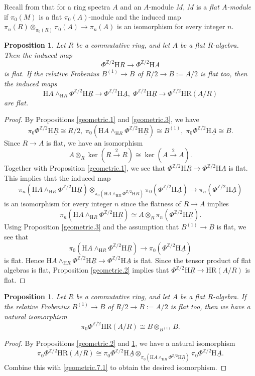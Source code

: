 \documentclass[10pt]{amsart}
\newtheorem{prop}[thm]{Proposition}
\theoremstyle{definition}
\numberwithin{equation}{section}
\newcommand{\Z}{\mathbb{Z}}
\newcommand{\rH}{\mathrm{H}}
\newcommand{\ul}{\underline}
\newcommand{\HR}{\mathrm{HR}}
\begin{document}
{Recall from \cite[Definition 7.2.2.10]{HA} that for a ring spectra $A$ and an $A$-module $M$,
$M$ is a \emph{flat $A$-module} if $\pi_0(M)$ is a flat $\pi_0(A)$-module and the induced map $\pi_n(R)\otimes_{\pi_0(R)}\pi_0(A)\to \pi_n(A)$ is an isomorphism for every integer $n$.

\begin{prop}
\label{geometric.7}
Let $R$ be a commutative ring,
and let $A$ be a flat $R$-algebra.
Then the induced map
\[
\Phi^{\Z/2}\rH \ul{R}\to \Phi^{\Z/2}\rH \ul{A}
\]
is flat.
If the relative Frobenius $B^{(1)}\to B$ of $R/2\to B:=A/2$ is flat too,
then the induced maps
\[
\rH A\wedge_{\rH R} \Phi^{\Z/2}\rH \ul{R}\to \Phi^{\Z/2}\rH \ul{A},
\;
\Phi^{\Z/2}\rH \ul{R}\to  \Phi^{\Z/2}\HR(A/R)
\]
are flat.
\end{prop}
\begin{proof}
By Propositions \ref{geometric.1} and \ref{geometric.3},
we have
\begin{equation}
\label{geometric.7.1}
\pi_0 \Phi^{\Z/2}\rH \ul{R}\cong R/2,
\;
\pi_0 (\rH A\wedge_{\rH R}\Phi^{\Z/2}\rH \ul{R})\cong B^{(1)},
\;
\pi_0 \Phi^{\Z/2}\rH \ul{A}\cong B.
\end{equation}
Since $R\to A$ is flat,
we have an isomorphism
\[
A\otimes_R \ker(R\xrightarrow{2} R)
\cong
\ker(A\xrightarrow{2} A).
\]
Together with Proposition \ref{geometric.1},
we see that $\Phi^{\Z/2}\rH \ul{R}\to \Phi^{\Z/2}\rH \ul{A}$ is flat.
This implies that the induced map
\[
\pi_n(\rH A\wedge_{\rH R} \Phi^{\Z/2}\rH \ul{R})
\otimes_{\pi_0(\rH A\wedge_{\rH R} \Phi^{\Z/2}\rH \ul{R})}
\pi_0(\Phi^{\Z/2}\rH \ul{A})
\to
\pi_n(\Phi^{\Z/2}\rH \ul{A})
\]
is an isomorphism for every integer $n$ since the flatness of $R\to A$ implies
\[
\pi_n(\rH A\wedge_{\rH R} \Phi^{\Z/2}\rH \ul{R})
\simeq
A\otimes_R \pi_n(\Phi^{\Z/2}\rH \ul{R}).
\]
Using Proposition \ref{geometric.3} and the assumption that $B^{(1)}\to B$ is flat,
we see that
\[
\pi_0(\rH A\wedge_{\rH R} \Phi^{\Z/2}\rH \ul{R})\to \pi_0(\Phi^{\Z/2}\rH \ul{A})
\]
is flat.
Hence $\rH A\wedge_{\rH R} \Phi^{\Z/2}\rH \ul{R}\to \Phi^{\Z/2}\rH \ul{A}$ is flat.
Since the tensor product of flat algebras is flat,
Proposition \ref{geometric.2} implies that $\Phi^{\Z/2}\rH \ul{R}\to \HR(A/R)$ is flat.
\end{proof}

\begin{prop}
\label{geometric.4}
Let $R$ be a commutative ring,
and let $A$ be a flat $R$-algebra.
If the relative Frobenius $B^{(1)}\to B$ of $R/2\to B:=A/2$ is flat too,
then we have a natural isomorphism
\[
\pi_0 \Phi^{\Z/2}\HR(A/R)
\cong
B\otimes_{B^{(1)}}B.
\]
\end{prop}
\begin{proof}
By Propositions \ref{geometric.2} and \ref{geometric.7},
we have a natural isomorphism
\[
\pi_0 \Phi^{\Z/2} \HR(A/R)
\cong
\pi_0 \Phi^{\Z/2} \rH \ul{A}
\otimes_{\pi_0(\rH A\wedge_{\rH R} \Phi^{\Z/2} \rH \ul{R})}
\pi_0 \Phi^{\Z/2} \rH \ul{A}.
\]
Combine this with \eqref{geometric.7.1} to obtain the desired isomorphism.
\end{proof}


}
\end{document}

